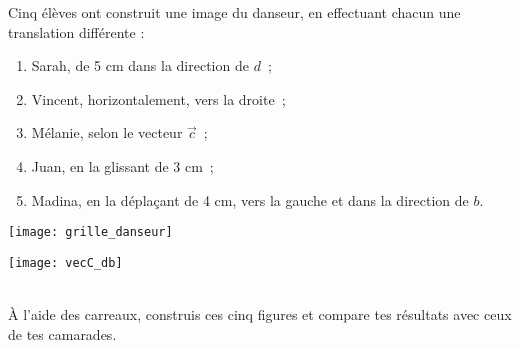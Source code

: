 \begin{activite}

Cinq élèves ont construit une image du danseur, en effectuant chacun une translation différente :
\begin{enumerate}
 \item Sarah, de 5 cm dans la direction de $d$ ;
 \item Vincent, horizontalement, vers la droite ;
 \item Mélanie, selon le vecteur $\vec{c}$ ;
 \item Juan, en la glissant de 3 cm ;
 \item Madina, en la déplaçant de 4 cm, vers la gauche et dans la direction de $b$.
 \end{enumerate}
 \begin{minipage}[c]{0.58\linewidth}
  \texttt{[image: grille\_danseur]} 
  \end{minipage} \hfill%
  \begin{minipage}[c]{0.28\linewidth}
  \texttt{[image: vecC\_db]}
  \end{minipage} \\
À l'aide des carreaux, construis ces cinq figures et compare tes résultats avec ceux de tes camarades.

\end{activite}


\newpage

